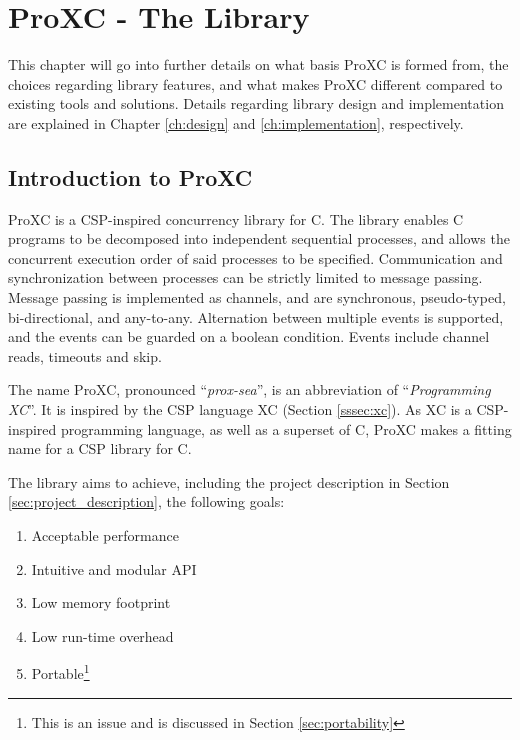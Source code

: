 
\chapter{ProXC - The Library}
\label{ch:proxc_library}

This chapter will go into further details on what basis ProXC is formed from, the choices regarding library features, and what makes ProXC different compared to existing tools and solutions. Details regarding library design and implementation are explained in Chapter \ref{ch:design} and \ref{ch:implementation}, respectively. 


\section{Introduction to ProXC}
\label{sec:proxc_intro}

ProXC is a CSP\hyp{}inspired concurrency library for C. The library enables C programs to be decomposed into independent sequential processes, and allows the concurrent execution order of said processes to be specified. Communication and synchronization between processes can be strictly lim\-ited to message passing. Message passing is implemented as channels, and are synch\-ronous, pseudo\hyp{}typed, bi\hyp{}directional, and any\hyp{}to\hyp{}any. Alternation between multiple ev\-ents is supp\-orted, and the events can be guarded on a boolean condition. Events include channel reads, timeouts and skip. 

The name ProXC, pronounced ``\textit{prox\hyp{}sea}'', is an abbreviation of ``\textit{Programming XC}''. It is inspired by the CSP language XC (Section \ref{sssec:xc}). As XC is a CSP\hyp{}inspired programming language, as well as a superset of C, ProXC makes a fitting name for a CSP library for C. 

The library aims to achieve, including the project description in Section \ref{sec:project_description}, the following goals:
\begin{enumerate}
    \item Acceptable performance
    \item Intuitive and modular API
    \item Low memory footprint
    \item Low run\hyp{}time overhead
    \item Portable\footnote{This is an issue and is discussed in Section \ref{sec:portability}}
\end{enumerate}

